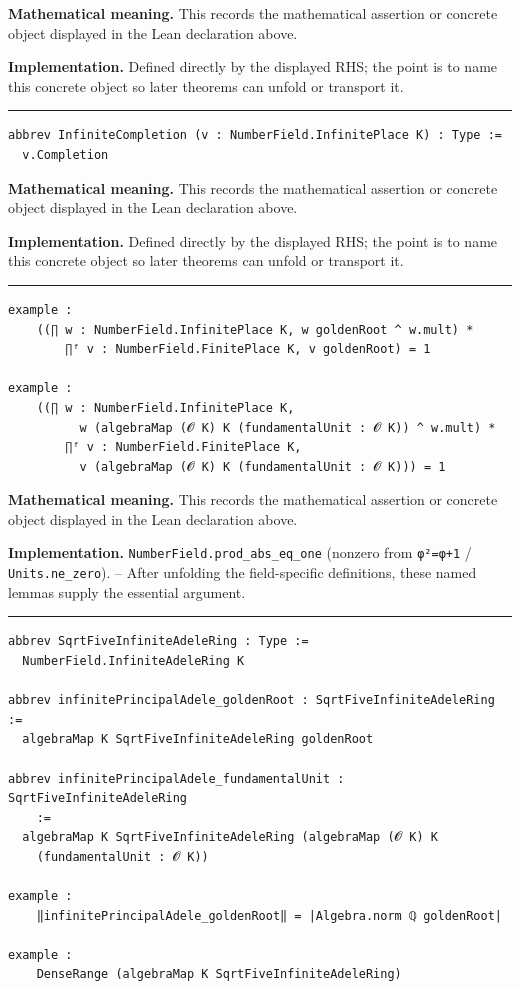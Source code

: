 \documentclass[UTF8,a4paper,11pt,fontset=fandol]{ctexart}
\theoremstyle{definition}
\newcommand{\statementsep}{\par\medskip\hrule\medskip}
\begin{document}
\noindent\textbf{Mathematical meaning.} This records the mathematical assertion or concrete object displayed in the Lean declaration above.\par
\noindent\textbf{Implementation.} Defined directly by the displayed RHS; the point is to name this concrete object so later theorems can unfold or transport it.\par
\statementsep
\begin{verbatim}
abbrev InfiniteCompletion (v : NumberField.InfinitePlace K) : Type :=
  v.Completion
\end{verbatim}
\noindent\textbf{Mathematical meaning.} This records the mathematical assertion or concrete object displayed in the Lean declaration above.\par
\noindent\textbf{Implementation.} Defined directly by the displayed RHS; the point is to name this concrete object so later theorems can unfold or transport it.\par
\statementsep
\begin{verbatim}
example :
    ((∏ w : NumberField.InfinitePlace K, w goldenRoot ^ w.mult) *
        ∏ᶠ v : NumberField.FinitePlace K, v goldenRoot) = 1

example :
    ((∏ w : NumberField.InfinitePlace K,
          w (algebraMap (𝓞 K) K (fundamentalUnit : 𝓞 K)) ^ w.mult) *
        ∏ᶠ v : NumberField.FinitePlace K,
          v (algebraMap (𝓞 K) K (fundamentalUnit : 𝓞 K))) = 1
\end{verbatim}
\noindent\textbf{Mathematical meaning.} This records the mathematical assertion or concrete object displayed in the Lean declaration above.\par
\noindent\textbf{Implementation.} \texttt{NumberField.\allowbreak{}prod\_\allowbreak{}abs\_\allowbreak{}eq\_\allowbreak{}one} (nonzero from \texttt{φ²=φ+1} / \texttt{Units.\allowbreak{}ne\_\allowbreak{}zero}). -- After unfolding the field-specific definitions, these named lemmas supply the essential argument.\par
\statementsep
\begin{verbatim}
abbrev SqrtFiveInfiniteAdeleRing : Type :=
  NumberField.InfiniteAdeleRing K

abbrev infinitePrincipalAdele_goldenRoot : SqrtFiveInfiniteAdeleRing :=
  algebraMap K SqrtFiveInfiniteAdeleRing goldenRoot

abbrev infinitePrincipalAdele_fundamentalUnit : SqrtFiveInfiniteAdeleRing
    :=
  algebraMap K SqrtFiveInfiniteAdeleRing (algebraMap (𝓞 K) K
    (fundamentalUnit : 𝓞 K))

example :
    ‖infinitePrincipalAdele_goldenRoot‖ = |Algebra.norm ℚ goldenRoot|

example :
    DenseRange (algebraMap K SqrtFiveInfiniteAdeleRing)
\end{verbatim}
\end{document}
